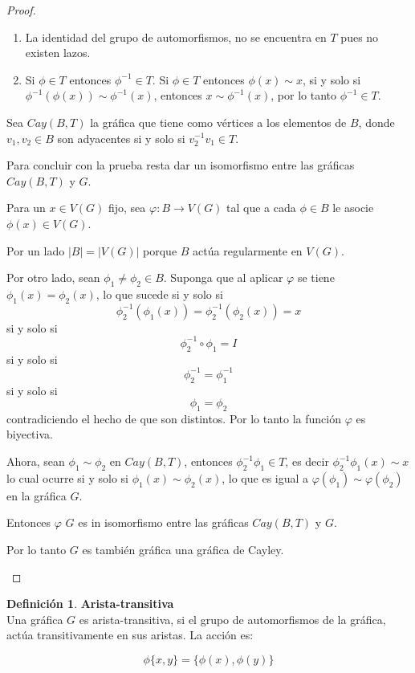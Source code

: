 \documentclass[12pt]{book}
\theoremstyle{definition}
\newtheorem{definition}{Definición}
\begin{document}
\begin{proof}
\begin{enumerate}
\begin{enumerate}
\item La identidad del grupo de automorfismos, no se encuentra en $T$
  pues no existen lazos.
\item Si $\phi \in T$ entonces $\phi^{-1}\in T$.
Si $\phi \in T$ entonces $\phi(x)\sim x$, si y solo si
$\phi^{-1}(\phi (x)) \sim \phi^{-1}(x)$, entonces $x \sim
\phi^{-1}(x)$, por lo tanto $\phi^{-1}\in T$.
\end{enumerate}

Sea $Cay(B,T)$ la gráfica que tiene como vértices a los elementos de
$B$, donde $v_1, v_2 \in B$ son adyacentes si y solo si $v_2^{-1}v_1
\in T$.

Para concluir con la prueba resta dar un isomorfismo entre las gráficas
$Cay(B,T)$ y $G$.

Para un $x\in V(G)$ fijo, sea $\varphi:B \rightarrow V(G)$ tal que a
cada $\phi \in B$ le asocie $\phi (x) \in V(G)$.

Por un lado $|B|=|V(G)|$ porque $B$ actúa regularmente en $V(G)$.

Por otro lado, sean $\phi_{1}\neq \phi_2 \in B$. Suponga que al
aplicar $\varphi$ se tiene $\phi_1(x)=\phi_2(x)$, lo que sucede si
y solo si
$$\phi_2^{-1}(\phi_1(x))=\phi_2^{-1}(\phi_2(x))=x$$
 si y solo si
 $$\phi_2^{-1}\circ \phi_1= I$$ si y solo si
$$\phi_2^{-1}=\phi_1^{-1}$$ si y solo si 
$$\phi_1 =\phi_2$$
contradiciendo el hecho de que son distintos. Por lo tanto la función $\varphi$
es biyectiva.

Ahora, sean $\phi_{1}\sim \phi_2$ en $Cay(B,T)$, entonces
$\phi_2^{-1}\phi_1 \in T$, es decir $\phi_2^{-1}\phi_1(x)\sim
x$ lo cual ocurre si y solo si $\phi_1(x)\sim \phi_2(x)$, lo que es
igual a $\varphi(\phi_1)\sim\varphi(\phi_2)$ en la gráfica
$G$.

Entonces $\varphi$ $G$ es in isomorfismo entre las gráficas
$Cay(B,T)$ y $G$. 

Por lo tanto $G$ es también gráfica una gráfica de Cayley.
\end{enumerate}
\end{proof}


\begin{definition}\textbf{Arista-transitiva}\\
  Una gráfica $G$ es arista-transitiva, si el grupo de automorfismos
  de la gráfica, actúa
  transitivamente en sus aristas. La acción es:

  \begin{equation*}\phi\{x,y\}=\{\phi(x),\phi(y)\}\end{equation*}
\end{definition}
\end{document}
